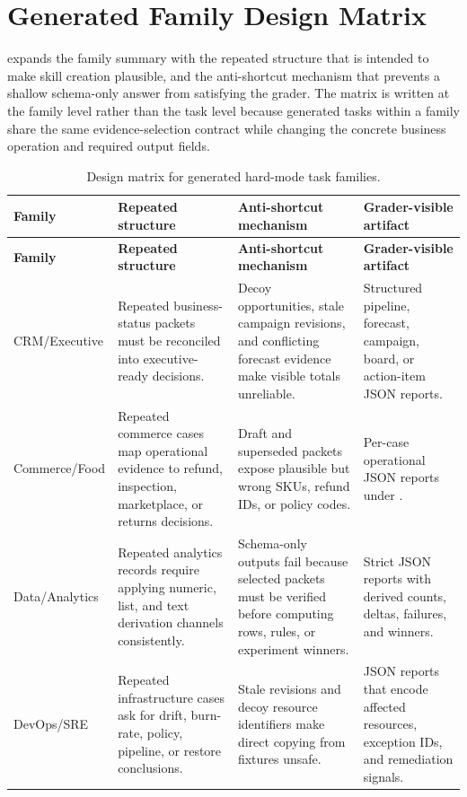 \documentclass[11pt]{article}
\begin{document}
\section{Generated Family Design Matrix}
\label{app:family-design-matrix}

 expands the family summary with the repeated structure that is intended to make skill creation plausible, and the anti-shortcut mechanism that prevents a shallow schema-only answer from satisfying the grader. The matrix is written at the family level rather than the task level because generated tasks within a family share the same evidence-selection contract while changing the concrete business operation and required output fields.
\begingroup
\small
\setlength{\tabcolsep}{3pt}
\begin{longtable}{L{0.18\textwidth}L{0.24\textwidth}L{0.27\textwidth}L{0.23\textwidth}}
\caption{Design matrix for generated hard-mode task families.}\label{tab:family-design-matrix}\\
\toprule
\textbf{Family} & \textbf{Repeated structure} & \textbf{Anti-shortcut mechanism} & \textbf{Grader-visible artifact} \\
\midrule
\endfirsthead
\toprule
\textbf{Family} & \textbf{Repeated structure} & \textbf{Anti-shortcut mechanism} & \textbf{Grader-visible artifact} \\
\midrule
\endhead
CRM/Executive & Repeated business-status packets must be reconciled into executive-ready decisions. & Decoy opportunities, stale campaign revisions, and conflicting forecast evidence make visible totals unreliable. & Structured pipeline, forecast, campaign, board, or action-item JSON reports. \\
Commerce/Food & Repeated commerce cases map operational evidence to refund, inspection, marketplace, or returns decisions. & Draft and superseded packets expose plausible but wrong SKUs, refund IDs, or policy codes. & Per-case operational JSON reports under . \\
Data/Analytics & Repeated analytics records require applying numeric, list, and text derivation channels consistently. & Schema-only outputs fail because selected packets must be verified before computing rows, rules, or experiment winners. & Strict JSON reports with derived counts, deltas, failures, and winners. \\
DevOps/SRE & Repeated infrastructure cases ask for drift, burn-rate, policy, pipeline, or restore conclusions. & Stale revisions and decoy resource identifiers make direct copying from fixtures unsafe. & JSON reports that encode affected resources, exception IDs, and remediation signals. \\

\end{longtable}
\end{document}

